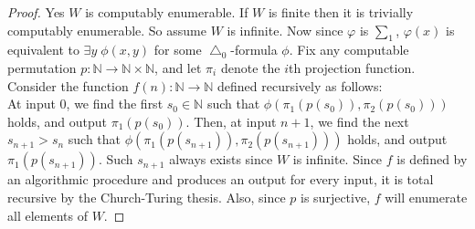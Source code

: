 \documentclass{article}
\begin{document}
\begin{enumerate}[label={\bf Q\arabic*:}]
    \begin{proof}
      Yes $W$ is computably enumerable. If $W$ is finite then it is
      trivially computably enumerable. So assume $W$ is infinite. Now since
      $\varphi$ is $\sum_1$, $\varphi(x)$ is equivalent to $\exists
      y\;\phi(x,y)$ for some $\bigtriangleup_0$-formula $\phi$. Fix any
      computable permutation
      $p:\mathbb{N}\rightarrow\mathbb{N}\times\mathbb{N}$, and let $\pi_i$
      denote the $i$th projection function. Consider the function
      $f(n):\mathbb{N}\rightarrow\mathbb{N}$ defined recursively as
      follows: \\

      At input $0$, we find the first $s_0\in\mathbb{N}$ such that
      $\phi(\pi_1(p(s_0)),\pi_2(p(s_0)))$ holds, and output
      $\pi_1(p(s_0))$. Then, at input $n+1$, we find the next
      $s_{n+1}>s_{n}$ such that $\phi(\pi_1(p(s_{n+1})),\pi_2(p(s_{n+1})))$
      holds, and output $\pi_1(p(s_{n+1}))$. Such $s_{n+1}$ always exists
      since $W$ is infinite. Since $f$ is defined by an algorithmic
      procedure and produces an output for every input, it is total
      recursive by the Church-Turing thesis. Also, since $p$ is surjective,
      $f$ will enumerate all elements of $W$. 
    \end{proof}
\end{enumerate}
\end{document}
